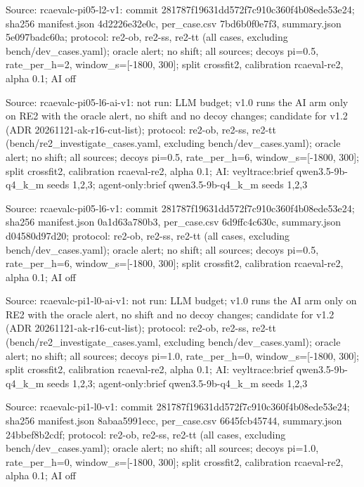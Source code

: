 \noindent Source: rcaevalc-pi05-l2-v1: commit 281787f19631dd572f7c910c360f4b08ede53e24; sha256 manifest.json 4d2226e32e0c, per\_case.csv 7bd6b0f0e7f3, summary.json 5e097badc60a; protocol: re2-ob, re2-ss, re2-tt (all cases, excluding bench/\allowbreak{}dev\_cases.yaml); oracle alert; no shift; all sources; decoys pi=0.5, rate\_per\_h=2, window\_s=[-1800, 300]; split crossfit2, calibration rcaeval-re2, alpha 0.1; AI off\par
\noindent Source: rcaevalc-pi05-l6-ai-v1: not run: LLM budget; v1.0 runs the AI arm only on RE2 with the oracle alert, no shift and no decoy changes; candidate for v1.2 (ADR 20261121-ak-r16-cut-list); protocol: re2-ob, re2-ss, re2-tt (bench/\allowbreak{}re2\_investigate\_cases.yaml, excluding bench/\allowbreak{}dev\_cases.yaml); oracle alert; no shift; all sources; decoys pi=0.5, rate\_per\_h=6, window\_s=[-1800, 300]; split crossfit2, calibration rcaeval-re2, alpha 0.1; AI: veyltrace:brief qwen3.5-9b-q4\_k\_m seeds 1,2,3; agent-only:brief qwen3.5-9b-q4\_k\_m seeds 1,2,3\par
\noindent Source: rcaevalc-pi05-l6-v1: commit 281787f19631dd572f7c910c360f4b08ede53e24; sha256 manifest.json 0a1d63a780b3, per\_case.csv 6d9ffc4c630c, summary.json d04580d97d20; protocol: re2-ob, re2-ss, re2-tt (all cases, excluding bench/\allowbreak{}dev\_cases.yaml); oracle alert; no shift; all sources; decoys pi=0.5, rate\_per\_h=6, window\_s=[-1800, 300]; split crossfit2, calibration rcaeval-re2, alpha 0.1; AI off\par
\noindent Source: rcaevalc-pi1-l0-ai-v1: not run: LLM budget; v1.0 runs the AI arm only on RE2 with the oracle alert, no shift and no decoy changes; candidate for v1.2 (ADR 20261121-ak-r16-cut-list); protocol: re2-ob, re2-ss, re2-tt (bench/\allowbreak{}re2\_investigate\_cases.yaml, excluding bench/\allowbreak{}dev\_cases.yaml); oracle alert; no shift; all sources; decoys pi=1.0, rate\_per\_h=0, window\_s=[-1800, 300]; split crossfit2, calibration rcaeval-re2, alpha 0.1; AI: veyltrace:brief qwen3.5-9b-q4\_k\_m seeds 1,2,3; agent-only:brief qwen3.5-9b-q4\_k\_m seeds 1,2,3\par
\noindent Source: rcaevalc-pi1-l0-v1: commit 281787f19631dd572f7c910c360f4b08ede53e24; sha256 manifest.json 8abaa5991ecc, per\_case.csv 6645fcb45744, summary.json 24bbef8b2cdf; protocol: re2-ob, re2-ss, re2-tt (all cases, excluding bench/\allowbreak{}dev\_cases.yaml); oracle alert; no shift; all sources; decoys pi=1.0, rate\_per\_h=0, window\_s=[-1800, 300]; split crossfit2, calibration rcaeval-re2, alpha 0.1; AI off\par
